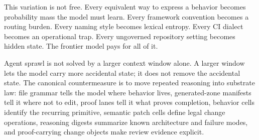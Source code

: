 This variation is not free. Every equivalent way to express a behavior becomes probability mass the model must learn. Every framework convention becomes a routing burden. Every naming style becomes lexical entropy. Every CI dialect becomes an operational trap. Every ungoverned repository setting becomes hidden state. The frontier model pays for all of it.

Agent sprawl is not solved by a larger context window alone. A larger window lets the model carry more accidental state; it does not remove the accidental state. The canonical countermeasure is to move repeated reasoning into substrate law: file grammar tells the model where behavior lives, generated-zone manifests tell it where not to edit, proof lanes tell it what proves completion, behavior cells identify the recurring primitive, semantic patch cells define legal change operations, reasoning digests summarize known architecture and failure modes, and proof-carrying change objects make review evidence explicit.

